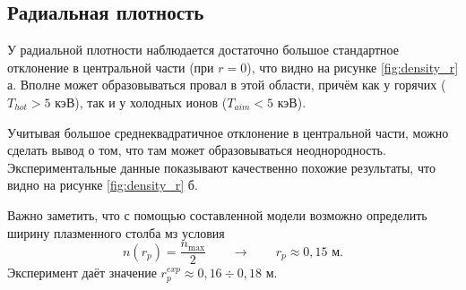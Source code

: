\subsection{Радиальная плотность}

У радиальной плотности наблюдается достаточно большое стандартное отклонение в центральной части (при $r = 0$), что видно на рисунке \ref{fig:density_r} а. Вполне может образовываться провал в этой области, причём как у горячих ($T_{hot} > 5 \text{ кэВ}$), так и у холодных ионов ($T_{aim} < 5 \text{ кэВ}$).

Учитывая большое среднеквадратичное отклонение в центральной части, можно сделать вывод о том, что там может образовываться неоднородность. Экспериментальные данные показывают качественно похожие результаты, что видно на рисунке \ref{fig:density_r} б.

Важно заметить, что с помощью составленной модели возможно определить ширину плазменного столба мз условия 
\begin{equation}
	n(r_p) = \frac{n_{\max}}{2} \qquad \to \qquad r_p \approx 0,15 \text{ м}.
\end{equation}
Эксперимент даёт значение $r_p^{exp} \approx 0,16 \div 0,18 \text{ м}$.

